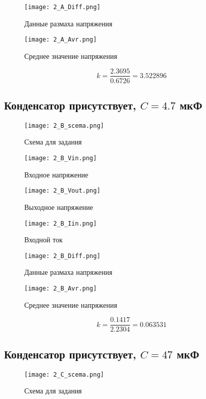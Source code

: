 \documentclass[a4paper,14pt]{article}
\begin{document}
\begin{figure}[H]
	\centering
	\texttt{[image: 2\_A\_Diff.png]}
	\caption{Данные размаха напряжения}	
\end{figure}

\begin{figure}[H]
	\centering
	\texttt{[image: 2\_A\_Avr.png]}
	\caption{Среднее значение напряжения}	
\end{figure}

$$k = \frac{2.3695}{0.6726} = 3.522896$$

\subsection{Конденсатор присутствует, $C = 4.7$ мкФ}
\begin{figure}[H]
	\centering
	\texttt{[image: 2\_B\_scema.png]}
	\caption{Схема для задания}	
\end{figure}

\begin{figure}[H]
	\centering
	\texttt{[image: 2\_B\_Vin.png]}
	\caption{Входное напряжение}	
\end{figure}

\begin{figure}[H]
	\centering
	\texttt{[image: 2\_B\_Vout.png]}
	\caption{Выходное напряжение}	
\end{figure}

\begin{figure}[H]
	\centering
	\texttt{[image: 2\_B\_Iin.png]}
	\caption{Входной ток}	
\end{figure}

\begin{figure}[H]
	\centering
	\texttt{[image: 2\_B\_Diff.png]}
	\caption{Данные размаха напряжения}	
\end{figure}

\begin{figure}[H]
	\centering
	\texttt{[image: 2\_B\_Avr.png]}
	\caption{Среднее значение напряжения}	
\end{figure}

$$k = \frac{0.1417}{2.2304} = 0.063531$$

\subsection{Конденсатор присутствует, $C = 47$ мкФ}
\begin{figure}[H]
	\centering
	\texttt{[image: 2\_C\_scema.png]}
	\caption{Схема для задания}	
\end{figure}
\end{document}
